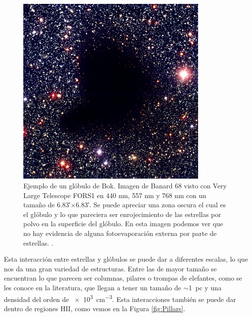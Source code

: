 \documentclass{book}
\begin{document}
\begin{figure}[htb]
    \centering
    \includegraphics[width=0.85\textwidth]{images Chapter 1/C1_Bok_globule.jpg}
    \caption{Ejemplo de un glóbulo de Bok. Imagen de Banard 68 visto con Very Large Telescope FORS1 en 440 nm, 557 nm y 768 nm con un tamaño de \ang{;6.83;}$\times$\ang{;6.83;}. Se puede apreciar una zona oscura el cual es el glóbulo y lo que pareciera ser enrojecimiento de las estrellas por polvo en la superficie del glóbulo. En esta imagen podemos ver que no hay evidencia de alguna fotoevaporación externa por parte de estrellas. \citep{Alves:2001}.}
    \label{fig:Banard}
\end{figure}

Esta interacción entre estrellas y glóbulos se puede dar a diferentes escalas, lo que nos da una gran variedad de estructuras. Entre las de mayor tamaño se encuentran lo que parecen ser columnas, pilares o trompas de elefantes, como se les conoce en la literatura, que llegan a tener un tamaño de $\sim$\SI{1}{pc} y una densidad del orden de \SI{e3}{cm^{-3}}. Esta interacciones también se puede dar dentro de regiones HII, como vemos en la Figura \ref{fig:Pillars}.
\end{document}
